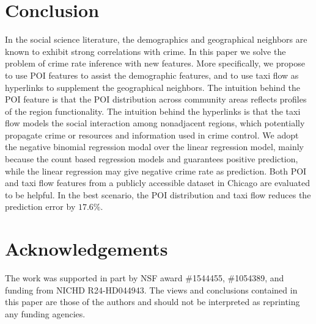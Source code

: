 
\section{Conclusion}
\label{sec:conclusion}

In the social science literature, the demographics and geographical neighbors are known to exhibit strong correlations with crime.
In this paper we solve the problem of crime rate inference with new features. More specifically, we propose to use POI features to assist the demographic features, and to use taxi flow as hyperlinks to supplement the geographical neighbors.  The intuition behind the POI feature is that the POI distribution across community areas reflects profiles of the region functionality. The intuition behind the hyperlinks is that the taxi flow models the social interaction among nonadjacent regions, which potentially propagate crime or resources and information used in crime control. We adopt the negative binomial regression modal over the linear regression model, mainly because the count based regression models and guarantees positive prediction, while the linear regression may give negative crime rate as prediction.  Both POI and taxi flow features from a publicly accessible dataset in Chicago are evaluated to be helpful. In the best scenario, the POI distribution and taxi flow reduces the prediction error by $17.6\%$. 





\section{Acknowledgements}


The work was supported in part by NSF award \#1544455, \#1054389, and funding from NICHD R24-HD044943. The views and conclusions contained in this paper are those of the authors and should not be interpreted as reprinting any funding agencies.